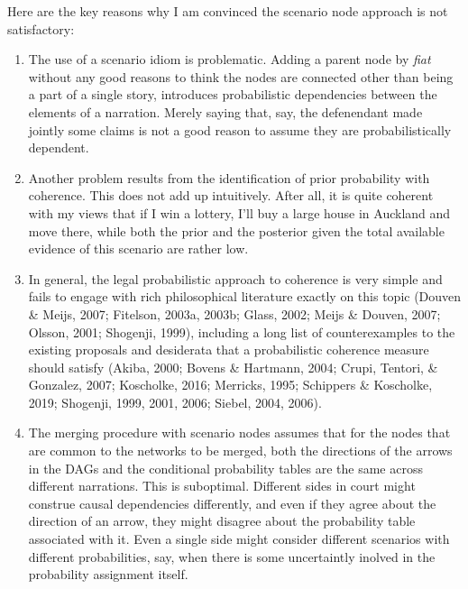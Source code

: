 \documentclass[11pt,dvipsnames,enabledeprecatedfontcommands]{scrartcl}
\begin{document}
Here are the key reasons why I am convinced the scenario node approach
is not satisfactory:

\begin{enumerate}
\def\labelenumi{\Alph{enumi}.}
\item
  The use of a scenario idiom is problematic. Adding a parent node by
  \emph{fiat} without any good reasons to think the nodes are connected
  other than being a part of a single story, introduces probabilistic
  dependencies between the elements of a narration. Merely saying that,
  say, the defenendant made jointly some claims is not a good reason to
  assume they are probabilistically dependent.
\item
  Another problem results from the identification of prior probability
  with coherence. This does not add up intuitively. After all, it is
  quite coherent with my views that if I win a lottery, I'll buy a large
  house in Auckland and move there, while both the prior and the
  posterior given the total available evidence of this scenario are
  rather low.
\item
  In general, the legal probabilistic approach to coherence is very
  simple and fails to engage with rich philosophical literature exactly
  on this topic (Douven \& Meijs, 2007; Fitelson, 2003a, 2003b; Glass,
  2002; Meijs \& Douven, 2007; Olsson, 2001; Shogenji, 1999), including
  a long list of counterexamples to the existing proposals and
  desiderata that a probabilistic coherence measure should satisfy
  (Akiba, 2000; Bovens \& Hartmann, 2004; Crupi, Tentori, \& Gonzalez,
  2007; Koscholke, 2016; Merricks, 1995; Schippers \& Koscholke, 2019;
  Shogenji, 1999, 2001, 2006; Siebel, 2004, 2006).
\item
  The merging procedure with scenario nodes assumes that for the nodes
  that are common to the networks to be merged, both the directions of
  the arrows in the DAGs and the conditional probability tables are the
  same across different narrations. This is suboptimal. Different sides
  in court might construe causal dependencies differently, and even if
  they agree about the direction of an arrow, they might disagree about
  the probability table associated with it. Even a single side might
  consider different scenarios with different probabilities, say, when
  there is some uncertaintly inolved in the probability assignment
  itself.
\end{enumerate}

\vspace{2mm}
\end{document}
